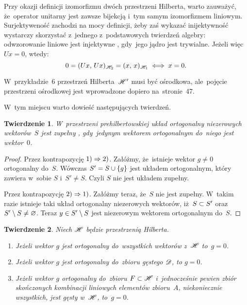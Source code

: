 \documentclass[a4paper,11pt]{article}
\newtheorem{twr}{Twierdzenie} %
\begin{document}
\vspace{\spaceFour}


\start {} Przy okazji definicji izomorfizmu dwóch przestrzeni
Hilberta, warto zauważyć, że~operator unitarny jest zawsze bijekcją
i~tym samym izomorfizmem liniowym. Surjektyweność zachodzi na mocy
definicji, żeby zaś wykazać inijektywność wystarczy skorzystać
z~jednego z~podstawowych twierdzeń algebry: odwzorowanie liniowe jest
injektywne \wtw, gdy~jego jądro jest trywialne. Jeżeli więc $Ux = 0$,
wtedy:
\begin{equation*}
  0 = (  Ux , \,  Ux  )_{ \mathcal{H}_{ 2 } } = (  x , \,  x  )_{ \mathcal{H}_{ 1 } } \iff x = 0.
\end{equation*}

\vspace{\spaceFour}


\start {} W~przykładzie~6 przestrzeń Hilberta~$\mathcal{H}'$ musi być
ośrodkowa, ale~pojęcie przestrzeni ośrodkowej jest wprowadzone dopiero
na~stronie~47. %

\vspace{\spaceFour}


\start {} W~tym miejscu warto dowieść następujących twierdzeń.
\begin{twr}
  \label{twr:UkladZupelny}
  W~przestrzeni prehilbertowskiej układ ortogonalny niezerowych
  wektorów~$S$ jest zupełny \wtw, gdy~jedynym wektorem ortogonalnym
  do~niego jest wektor~$0$.
\end{twr}

\begin{proof}
  Przez kontrapozycję $1) \Rightarrow 2)$. Załóżmy, że~istnieje wektor
  $g \neq 0$ ortogonalny do~$S$. Wówczas $S' = S \cup \{  g  \}$ jest
  układem ortogonalnym, który zawiera w~sobie $S$ i~$S' \neq S$. Czyli
  $S$ nie jest układem zupełny.

  Przez kontrapozycję $2) \Rightarrow 1)$. Załóżmy teraz, że~$S$ nie jest
  zupełny. W~takim razie istnieje taki układ ortogonalny niezerowych
  wektorów, iż~$S \subset S'$ oraz $S' \setminus S \neq \varnothing$. Teraz
  $y \in S' \setminus S$ jest niezerowym wektorem ortogonalnym do~$S$.
\end{proof}

\begin{twr}
  \label{twr:OrotgonalnoscDoZbioruGestegoIBazy}
  Niech $\mathcal{H}$ będzie przestrzenią Hilberta.
  \begin{enumerate}
  \item Jeżeli wektor $g$ jest ortogonalny do~wszystkich wektorów
    z~$\mathcal{H}$ to~$g = 0$.
  \item Jeżeli wektor $g$ jest ortogonalny do~zbioru gęstego $\mathcal{D}$, to
    $g = 0$.
  \item Jeżeli wektor $g$ ortogonalny do~zbioru $F \subset \mathcal{H}$
    i~jednocześnie pewien zbiór skończonych kombinacji liniowych
    elementów zbioru~$A$, niekoniecznie wszystkich, jest gęsty
    w~$\mathcal{H}$, to~$g = 0$.
  \end{enumerate}
\end{twr}
\end{document}
